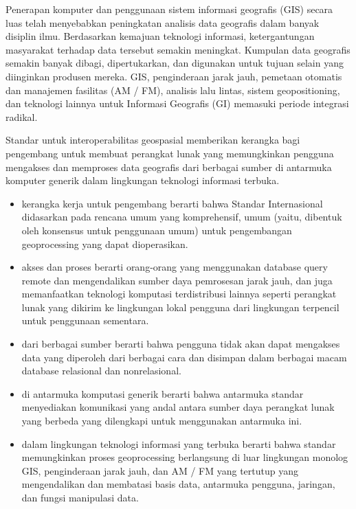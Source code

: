Penerapan komputer dan penggunaan sistem informasi geografis (GIS) secara luas telah menyebabkan peningkatan analisis data geografis dalam banyak disiplin ilmu. Berdasarkan kemajuan teknologi informasi, ketergantungan masyarakat terhadap data tersebut semakin meningkat. Kumpulan data geografis semakin banyak dibagi, dipertukarkan, dan digunakan untuk tujuan
selain yang diinginkan produsen mereka. GIS, penginderaan jarak jauh, pemetaan otomatis dan manajemen fasilitas (AM / FM), analisis lalu lintas, sistem geopositioning, dan teknologi lainnya untuk Informasi Geografis (GI) memasuki periode integrasi radikal. 

Standar untuk interoperabilitas geospasial memberikan kerangka bagi pengembang untuk membuat perangkat lunak yang memungkinkan pengguna mengakses dan memproses data geografis dari berbagai sumber di antarmuka komputer generik dalam lingkungan teknologi informasi terbuka.
\begin{itemize}
\item kerangka kerja untuk pengembang berarti bahwa Standar Internasional didasarkan pada rencana umum yang komprehensif, umum (yaitu, dibentuk oleh konsensus untuk penggunaan umum) untuk pengembangan geoprocessing yang dapat dioperasikan.

\item akses dan proses berarti orang-orang yang menggunakan database query remote dan mengendalikan sumber daya pemrosesan jarak jauh, dan juga memanfaatkan teknologi komputasi terdistribusi lainnya seperti perangkat lunak yang dikirim ke lingkungan lokal pengguna dari lingkungan terpencil untuk penggunaan sementara.

\item dari berbagai sumber berarti bahwa pengguna tidak akan dapat mengakses data yang diperoleh dari berbagai cara dan disimpan dalam berbagai macam database relasional dan nonrelasional.

\item di antarmuka komputasi generik berarti bahwa antarmuka standar menyediakan komunikasi yang andal antara sumber daya perangkat lunak yang berbeda yang dilengkapi untuk menggunakan antarmuka ini.

\item dalam lingkungan teknologi informasi yang terbuka berarti bahwa standar memungkinkan proses geoprocessing berlangsung di luar lingkungan monolog GIS, penginderaan jarak jauh, dan AM / FM yang tertutup yang mengendalikan dan membatasi basis data, antarmuka pengguna, jaringan, dan fungsi manipulasi data. \cite{lupp2008open} 
\end{itemize}
